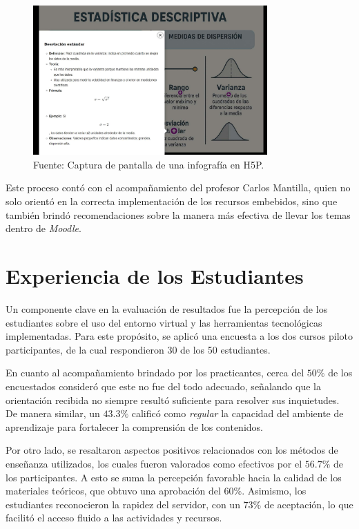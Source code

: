 \documentclass[letter,oneside,12pt,spanish]{report}
\begin{document}
\begin{figure}[ht]
	\centering
	\includegraphics[width=0.8\textwidth]{Figs/Infografia_H5P.pdf}
	\label{fig:H5P}
	\\Fuente: Captura de pantalla de una infografía en H5P.
\end{figure}

\newpage

Este proceso contó con el acompañamiento del profesor Carlos Mantilla, quien no solo orientó en la correcta implementación de los recursos embebidos, sino que también brindó recomendaciones sobre la manera más efectiva de llevar los temas dentro de \textit{Moodle}.

\section{Experiencia de los Estudiantes}

Un componente clave en la evaluación de resultados fue la percepción de los estudiantes sobre el uso del entorno virtual y las herramientas tecnológicas implementadas. Para este propósito, se aplicó una encuesta a los dos cursos piloto participantes, de la cual respondieron 30 de los 50 estudiantes.

En cuanto al acompañamiento brindado por los practicantes, cerca del $50\%$ de los encuestados consideró que este no fue del todo adecuado, señalando que la orientación recibida no siempre resultó suficiente para resolver sus inquietudes. De manera similar, un $43.3\%$ calificó como \textit{regular} la capacidad del ambiente de aprendizaje para fortalecer la comprensión de los contenidos.

Por otro lado, se resaltaron aspectos positivos relacionados con los métodos de enseñanza utilizados, los cuales fueron valorados como efectivos por el $56.7\%$ de los participantes. A esto se suma la percepción favorable hacia la calidad de los materiales teóricos, que obtuvo una aprobación del $60\%$. Asimismo, los estudiantes reconocieron la rapidez del servidor, con un $73\%$ de aceptación, lo que facilitó el acceso fluido a las actividades y recursos.
\end{document}

